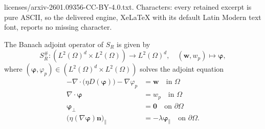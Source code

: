 \documentclass[10pt,a4paper]{amsart}
\newcommand{\lzd}{{L^2(\Omega)^d}}
\newcommand{\lzo}{L^2(\Omega)}
\begin{document}
licenses/arxiv-2601.09356-CC-BY-4.0.txt. Characters: every retained excerpt is pure ASCII, so the delivered engine, XeLaTeX with its default Latin Modern text font, reports no missing character.
\begin{lemma}
\label{lemma:banach_robin}
    The Banach adjoint operator of $S_R$ is given by
    \begin{displaymath}
        S_R^{\#}:\left(\lzd \times \lzo\right) \rightarrow \lzd, \quad (\mathbf{w},w_p) \mapsto \boldsymbol{\varphi},
    \end{displaymath} where $\left(\boldsymbol{\varphi},\varphi_p\right)\in \left(\lzd \times \lzo\right)$ solves the adjoint equation
      \begin{equation} \label{eq-adjoint}
 \begin{split}
  -\nabla \cdot \big( \eta D(\boldsymbol{\varphi}) \big) - \nabla \varphi_p &= \mathbf{w} \quad \text{in } \Omega\\
  \nabla \cdot \boldsymbol{\varphi} &= w_p \quad \text{in } \Omega\\
  \boldsymbol{\varphi}_{\bot} &= \mathbf{0} \quad \text{on } \partial\Omega \\
  \big(\eta (\nabla \boldsymbol{\varphi})\mathbf{n} \big)_{\parallel} &= -\lambda \boldsymbol{\varphi}_{\parallel}\quad \text{on } \partial\Omega.
  \end{split}
\end{equation}
\end{lemma}
\end{document}
